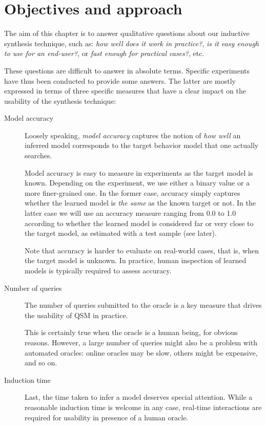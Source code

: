 \section{Objectives and approach\label{section:evaluation-objectives-and-approach}}

The aim of this chapter is to answer qualitative questions about our inductive synthesis technique, such as: \emph{how well does it work in practice?}, \emph{is it easy enough to use for an end-user?}, or \emph{fast enough for practical cases?}, etc. 

These questions are difficult to answer in absolute terms. Specific experiments have thus been conducted to provide some answers. The latter are mostly expressed in terms of three specific measures that have a clear impact on the usability of the synthesis technique:
\begin{description}
\item[Model accuracy] Loosely speaking, \emph{model accuracy} captures the notion of \emph{how well} an inferred model corresponds to the target behavior model that one actually searches. 

Model accuracy is easy to measure in experiments as the target model is known. Depending on the experiment, we use either a binary value or a more finer-grained one. In the former case, accuracy simply captures whether the learned model is \emph{the same} as the known target or not. In the latter case we will use an accuracy measure ranging from 0.0 to 1.0 according to whether the learned model is considered far or very close to the target model, as estimated with a test sample (see later).

Note that accuracy is harder to evaluate on real-world cases, that is, when the target model is unknown. In practice, human inspection of learned models is typically required to assess accuracy.

\item[Number of queries] The number of queries submitted to the oracle is a key measure that drives the usability of QSM in practice. 

This is certainly true when the oracle is a human being, for obvious reasons. However, a large number of queries might also be a problem with automated oracles: online oracles may be slow, others might be expensive, and so on.

\item[Induction time] Last, the time taken to infer a model deserves special attention. While a reasonable induction time is welcome in any case, real-time interactions are required for usability in presence of a human oracle.
\end{description}

